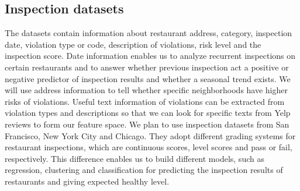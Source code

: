 \documentclass[12pt]{article}%
\begin{document}
\subsection{Inspection datasets}
The datasets contain information about restaurant address, category, inspection date, violation type or code, description of violations, risk level and the inspection score. Date information enables us to analyze recurrent inspections on certain restaurants and to answer whether previous inspection act a positive or negative predictor of inspection results and whether a seasonal trend exists. We will use address information to tell whether specific neighborhoods have higher risks of violations. Useful text information of violations can be extracted from violation types and descriptions so that we can look for specific texts from Yelp reviews to form our feature space. We plan to use inspection datasets from San Francisco, New York City and Chicago. They adopt different grading systems for restaurant inspections, which are continuous scores, level scores and pass or fail, respectively. This difference enables us to build different models, such as regression, clustering and classification for predicting the inspection results of restaurants and giving expected healthy level.
\end{document}
